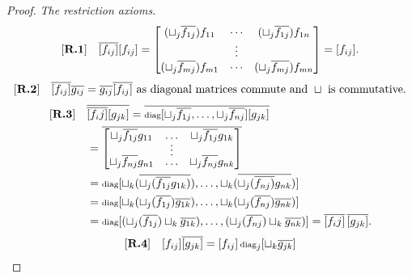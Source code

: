 \begin{proof}
  \emph{The restriction axioms.}
  \begin{align*}
    [\text{\bfseries {R}.{1}}] \quad& \overline{[f_{ij}]}[f_{ij}] =
      \begin{bmatrix}
        (\sqcup_j \overline{f_{1j}}) f_{11} & \cdots & (\sqcup_j \overline{f_{1 j}}) f_{1n}\\
        & \vdots & \\
        (\sqcup_j \overline{f_{mj}}) f_{m1} & \cdots & (\sqcup_j \overline{f_{mj}}) f_{m n}
      \end{bmatrix} = [f_{ij}].\\
  \end{align*}
  \begin{align*}
    [\text{\bfseries {R}.{2}}] \quad & \overline{[f_{ij}]} \overline{g_{ij}} =  \overline{g_{ij}} \overline{[f_{ij}]}
      \text{ as diagonal matrices commute and }\sqcup\text{ is commutative.}\\
  \end{align*}
  \begin{align*}
    [\text{\bfseries {R}.{3}}] \quad & \overline{\overline{[f_ij]}[g_{j k}]} =
      \overline{\operatorname{\scriptstyle{diag}}[\sqcup_j \overline{f_{1j}},\ldots,\sqcup_j \overline{f_{n j}}] [g_{j k}]}
      \\
      & = \overline{\begin{bmatrix}
        \sqcup_j \overline{f_{1j}} g_{11} & \ldots & \sqcup_j \overline{f_{1 j}} g_{1 k}\\[-4pt]
        & \vdots & \\[-4pt]
        \sqcup_j \overline{f_{nj}} g_{n 1} & \ldots & \sqcup_j \overline{f_{n j}} g_{n k}\\
      \end{bmatrix}} \\
      & = \operatorname{\scriptstyle{diag}}[\sqcup_k (\overline{\sqcup_j (\overline{f_{1j}} g_{1k})}), \ldots,
                 \sqcup_k (\overline{\sqcup_j(\overline{f_{nj})} g_{n k}})]\\
      & = \operatorname{\scriptstyle{diag}}[\sqcup_k (\sqcup_j(\overline{f_{1j}}) \overline{g_{1k}}), \ldots,
                 \sqcup_k (\sqcup_j(\overline{f_{nj}}) \overline{g_{n k}})]\\
      & = \operatorname{\scriptstyle{diag}}[(\sqcup_j(\overline{f_{1j}}) \sqcup_k  \overline{g_{1k}}), \ldots,
                 (\sqcup_j(\overline{f_{nj}}) \sqcup_k  \overline{g_{n k}})] = \overline{[f_ij]}\,\overline{[g_{j k}]}.\\
  \end{align*}
  \begin{align*}
      \rfour \quad & [f_{i\jay}]\rst{[g_{\jay k}]} =
        [f_{i\jay}]\diag_\jay[\djoin_k \rst{g_{\jay k}}]
        \\

\end{align*}
\end{proof}
